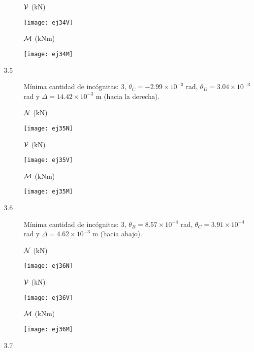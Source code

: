 \begin{description}
${\mathcal V}$ (kN)

\begin{center}
	\texttt{[image: ej34V]}
\end{center}

${\mathcal M}$ (kNm)

\begin{center}
	\texttt{[image: ej34M]}
\end{center}


\item [3.5]

Mínima cantidad de incógnitas: 3, $\theta_C = -2.99 \times 10^{-3}$ rad, $ \theta_D = 3.04 \times 10^{-3}$ rad y $\Delta  = 14.42 \times 10^{-3}$ m (hacia la derecha).
%

${\mathcal N}$ (kN)

\begin{center}
	\texttt{[image: ej35N]}
\end{center}

${\mathcal V}$ (kN)

\begin{center}
	\texttt{[image: ej35V]}
\end{center}

${\mathcal M}$ (kNm)

\begin{center}
	\texttt{[image: ej35M]}
\end{center}



\item[3.6]
Mínima cantidad de incógnitas: 3, $\theta_B = 8.57 \times 10^{-4}$ rad, $\theta_C = 3.91 \times 10^{-4}$ rad y $\Delta  = 4.62 \times 10^{-3} $ m (hacia abajo).

${\mathcal N}$ (kN)

\begin{center}
	\texttt{[image: ej36N]}
\end{center}

${\mathcal V}$ (kN)

\begin{center}
	\texttt{[image: ej36V]}
\end{center}

${\mathcal M}$ (kNm)

\begin{center}
	\texttt{[image: ej36M]}
\end{center}

\item[3.7]


\end{description}
